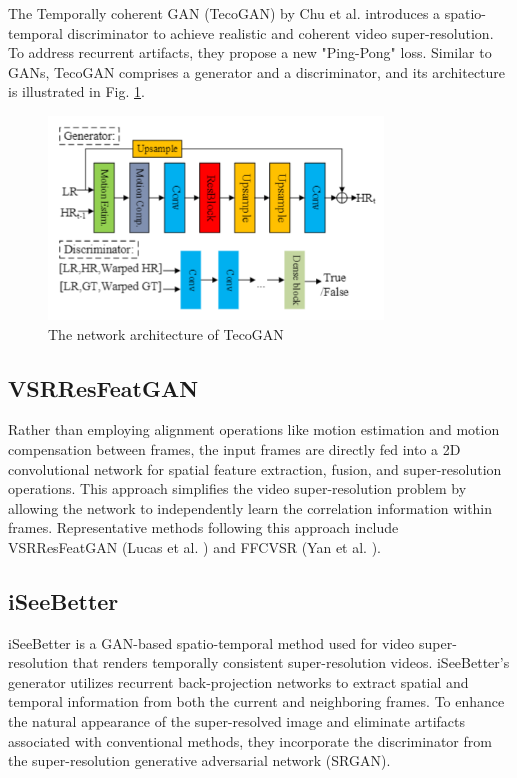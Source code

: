 \documentclass[conference]{IEEEtran}
\begin{document}
The Temporally coherent GAN (TecoGAN) by Chu et al. \cite{tecogan_2018} introduces a spatio-temporal discriminator to achieve realistic and coherent video super-resolution. To address recurrent artifacts, they propose a new "Ping-Pong" loss. Similar to GANs, TecoGAN comprises a generator and a discriminator, and its architecture is illustrated in Fig. \ref{fig:tecogan}.

\begin{figure}[b]
    \centering
    \centerline{\includegraphics[width=8.9cm]{tecogan}}
    \caption{The network architecture of TecoGAN \cite{video_super_resolution_survey_2020}}
    \label{fig:tecogan}
\end{figure}

\subsection{VSRResFeatGAN}

Rather than employing alignment operations like motion estimation and motion compensation between frames, the input frames are directly fed into a 2D convolutional network for spatial feature extraction, fusion, and super-resolution operations. This approach simplifies the video super-resolution problem by allowing the network to independently learn the correlation information within frames. Representative methods following this approach include VSRResFeatGAN (Lucas et al. \cite{GANs_perc_loss_vsr_2018}) and FFCVSR (Yan et al. \cite{Yan_frame_vsr_2019}).

\subsection{iSeeBetter}

iSeeBetter \cite{iSeeBetter_2020} is a GAN-based spatio-temporal method used for video super-resolution that renders temporally consistent super-resolution videos. iSeeBetter's generator utilizes recurrent back-projection networks to extract spatial and temporal information from both the current and neighboring frames. To enhance the natural appearance of the super-resolved image and eliminate artifacts associated with conventional methods, they incorporate the discriminator from the super-resolution generative adversarial network (SRGAN).
\end{document}
